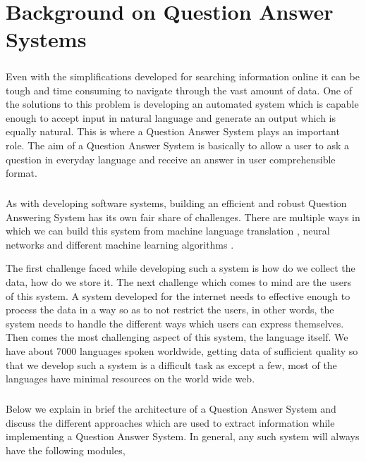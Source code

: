 \chapter{Background on Question Answer Systems}

\paragraph{}
Even with the simplifications developed for searching information online it can be tough and time consuming to navigate through the vast amount of data. One of the solutions to this problem is developing an automated system which is capable enough to accept input in natural language and generate an output which is equally natural. This is where a Question Answer System plays an important role. The aim of a Question Answer System is basically to allow a user to ask a question in everyday language and receive an answer in user comprehensible format. 

\paragraph{}
As with developing software systems, building an efficient and robust Question Answering System has its own fair share of challenges. There are multiple ways in which we can build this system from  machine language translation \cite {bao2014knowledge}, neural networks \cite{iyyer2014neural} and different machine learning algorithms \cite{zhang2003question}.

The first challenge faced while developing such a system is how do we collect the data, how do we store it. The next challenge which comes to mind are the users of this system. A system developed for the internet needs to effective enough to process the data in a way so as to not restrict the users, in other words, the system needs to handle the different ways which users can express themselves. Then comes the most challenging aspect of this system, the language itself. We have about 7000 languages spoken worldwide, getting data of sufficient quality so that we develop such a system is a difficult task as except a few, most of the languages have minimal resources on the world wide web.
 
\paragraph{}
Below we explain in brief the architecture of a Question Answer System and discuss the different approaches which are used to extract information while implementing a Question Answer System. In general, any such system will always have the following modules,

